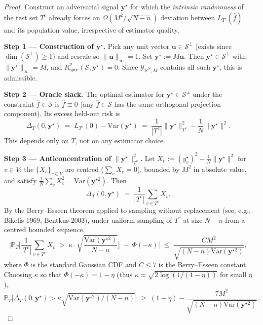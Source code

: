 \documentclass[11pt,a4paper]{article}
\theoremstyle{plain}
\theoremstyle{definition}
\theoremstyle{remark}
\newcommand{\by}{\mathbf{y}}
\newcommand{\bu}{\mathbf{u}}
\newcommand{\R}{\mathbb{R}}
\newcommand{\Var}{\mathrm{Var}}
\newcommand{\Rspec}{R^2_{\mathrm{spec}}}
\newcommand{\Scal}{\mathcal{S}}
\newcommand{\Ycal}{\mathcal{Y}}
\begin{document}
\begin{proof}
Construct an adversarial signal $\by^\star$ for which the
\emph{intrinsic randomness} of the test set $T^c$ already forces an
$\Omega(M^2/\sqrt{N-n})$ deviation between $L_{T^c}(\hat f)$ and its
population value, irrespective of estimator quality.

\smallskip
\textbf{Step 1 — Construction of $\by^\star$.}  Pick any unit vector
$\bu \in \Scal^\perp$ (exists since $\dim(\Scal^\perp) \geq 1$) and rescale
so $\|\bu\|_\infty = 1$.  Set $\by^\star := M \bu$.  Then $\by^\star \in
\Scal^\perp$ with $\|\by^\star\|_\infty = M$, and $\Rspec(\Scal,
\by^\star) = 0$.  Since $\Ycal_{\R^N, M}$ contains all such
$\by^\star$, this is admissible.

\smallskip
\textbf{Step 2 — Oracle slack.}  The optimal estimator for $\by^\star
\in \Scal^\perp$ under the constraint $\hat f \in \Scal$ is $\hat f
\equiv 0$ (any $\hat f \in \Scal$ has the same orthogonal-projection
component).  Its excess held-out risk is
\begin{equation}
    \Delta_T(0, \by^\star)
    \;=\; L_{T^c}(0) - \Var(\by^\star)
    \;=\; \frac{1}{|T^c|}\|\by^\star\|^2_{T^c} - \frac{1}{N}\|\by^\star\|^2.
\end{equation}
This depends only on $T$, not on any estimator choice.

\smallskip
\textbf{Step 3 — Anticoncentration of $\|\by^\star\|^2_{T^c}$.}  Let
$X_v := (y_v^\star)^2 - \frac{1}{N}\|\by^\star\|^2$ for $v \in V$; the
$\{X_v\}_{v\in V}$ are centred ($\sum_v X_v = 0$), bounded by $M^2$ in
absolute value, and satisfy $\frac{1}{N}\sum_v X_v^2 = \Var(\by^{\star 2})$.
Then
\begin{equation}
    \Delta_T(0, \by^\star)
    \;=\; \frac{1}{|T^c|}\sum_{v \in T^c} X_v.
\end{equation}
By the Berry--Esseen theorem applied to sampling without replacement
(see, e.g., Bikelis 1969, Bentkus 2003), under uniform sampling of
$T^c$ at size $N-n$ from a centred bounded sequence,
\begin{equation}
    \Bigg|
        \mathbb{P}_T\Bigg[\frac{1}{|T^c|}\sum_{v\in T^c} X_v \;>\;
            \kappa \cdot \sqrt{\frac{\Var(\by^{\star 2})}{N - n}}\Bigg]
        \;-\; \Phi(-\kappa)
    \Bigg| \;\leq\; \frac{C M^2}{\sqrt{(N-n) \Var(\by^{\star 2})}},
\end{equation}
where $\Phi$ is the standard Gaussian CDF and $C \leq 7$ is the
Berry--Esseen constant.  Choosing $\kappa$ so that $\Phi(-\kappa) = 1 - \eta$
(thus $\kappa \approx \sqrt{2 \log(1/(1-\eta))}$ for small $\eta$),
\begin{equation}
    \mathbb{P}_T\Bigg[\Delta_T(0, \by^\star) > \kappa \sqrt{\Var(\by^{\star 2})/(N-n)}\Bigg]
    \;\geq\; (1 - \eta) - \frac{7 M^2}{\sqrt{(N-n)\Var(\by^{\star 2})}}.
\end{equation}


\end{proof}
\end{document}

